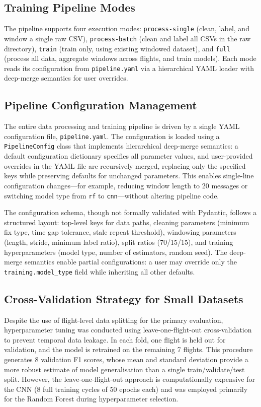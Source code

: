 \subsection{Training Pipeline Modes}

The pipeline supports four execution modes: \texttt{process-single} (clean, label, and window a single raw CSV), \texttt{process-batch} (clean and label all CSVs in the raw directory), \texttt{train} (train only, using existing windowed dataset), and \texttt{full} (process all data, aggregate windows across flights, and train models). Each mode reads its configuration from \texttt{pipeline.yaml} via a hierarchical YAML loader with deep-merge semantics for user overrides.

\subsection{Pipeline Configuration Management}

The entire data processing and training pipeline is driven by a single YAML configuration file, \texttt{pipeline.yaml}. The configuration is loaded using a \texttt{PipelineConfig} class that implements hierarchical deep-merge semantics: a default configuration dictionary specifies all parameter values, and user-provided overrides in the YAML file are recursively merged, replacing only the specified keys while preserving defaults for unchanged parameters. This enables single-line configuration changes---for example, reducing window length to 20 messages or switching model type from \texttt{rf} to \texttt{cnn}---without altering pipeline code.

The configuration schema, though not formally validated with Pydantic, follows a structured layout: top-level keys for data paths, cleaning parameters (minimum fix type, time gap tolerance, stale repeat threshold), windowing parameters (length, stride, minimum label ratio), split ratios (70/15/15), and training hyperparameters (model type, number of estimators, random seed). The deep-merge semantics enable partial configurations: a user may override only the \texttt{training.model\_type} field while inheriting all other defaults.

\subsection{Cross-Validation Strategy for Small Datasets}

Despite the use of flight-level data splitting for the primary evaluation, hyperparameter tuning was conducted using leave-one-flight-out cross-validation to prevent temporal data leakage. In each fold, one flight is held out for validation, and the model is retrained on the remaining 7 flights. This procedure generates 8 validation F1 scores, whose mean and standard deviation provide a more robust estimate of model generalisation than a single train/validate/test split. However, the leave-one-flight-out approach is computationally expensive for the CNN (8 full training cycles of 50 epochs each) and was employed primarily for the Random Forest during hyperparameter selection.


